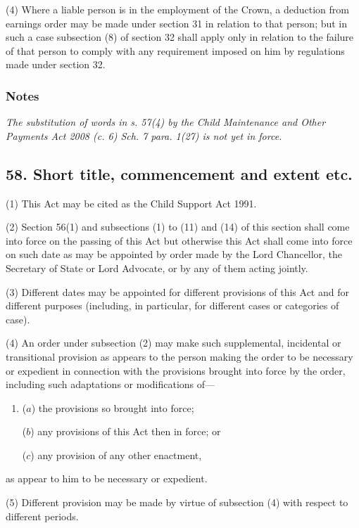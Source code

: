 \documentclass[a4paper]{article}
\newcommand\amendment[1]{\subsubsection*{Notes}{\itshape\frenchspacing\footnotesize #1 \par}}
\begin{document}
(4)
Where a liable person is in the employment of the Crown, a deduction from earnings order may be made under section 31 in relation to that person; but in such a case subsection (8) of section 32 shall apply only in relation to the failure of that person to comply with any requirement imposed on him by regulations made under section 32.

\amendment{
The substitution of words in s. 57(4) by the Child Maintenance and Other Payments Act 2008 (c. 6) Sch. 7 para. 1(27) is not yet in force.
}

\subsection{58. Short title, commencement and extent etc.}

(1) This Act may be cited as the Child Support Act 1991.

(2)
Section 56(1) and subsections (1) to (11) and (14) of this section shall come into force on the passing of this Act but otherwise this Act shall come into force on such date as may be appointed by order made by the Lord Chancellor, the Secretary of State or Lord Advocate, or by any of them acting jointly.

(3)
Different dates may be appointed for different provisions of this Act and for different purposes (including, in particular, for different cases or categories of case).

(4)
An order under subsection (2) may make such supplemental, incidental or transitional provision as appears to the person making the order to be necessary or expedient in connection with the provisions brought into force by the order, including such adaptations or modifications of---
\begin{enumerate}\item[]
($a$) the provisions so brought into force;

($b$) any provisions of this Act then in force; or

($c$)
any provision of any other enactment, 
\end{enumerate}
as appear to him to be necessary or expedient.

(5)
Different provision may be made by virtue of subsection (4) with respect to different periods.
\end{document}
